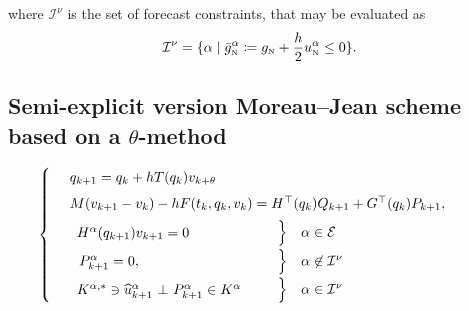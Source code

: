 where $\mathcal I^\nu$ is the set of forecast constraints, that may be evaluated as
\begin{equation}
  \label{eq:10}
  \mathcal I^\nu = \{\alpha \mid \bar g_{\hbox{\tiny{N}}}^\alpha \coloneqq g_{\hbox{\tiny{N}}} + \frac h 2 u^\alpha_{\hbox{\tiny{N}}} \leq 0\}.
\end{equation}


\subsection{Semi-explicit version Moreau--Jean scheme based on a  $\theta$-method}

\begin{equation}
    \label{eq:Moreau--Jean-explicit}
    \begin{cases}
      ~~\begin{array}{l}
        q_{k+1} = q_{k} + h T(q_{k}) v_{k+\theta} \quad \\[1ex]
        M(v_{k+1}-v_k) - h  F(t_{k}, q_{k},v_{k}) =  H^\top(q_{k}) Q_{k+1}+  G^\top(q_{k}) P_{k+1},\quad\,\\[1ex]
      \end{array}\\
      ~~\begin{array}{lcl}
        \begin{array}{l}
          H^\alpha(q_{k+1}) v_{k+1}  =  0\\
        \end{array} & \left. \begin{array}{l}
          \vphantom{H^\alpha(q_{k+1}) v_{k+1}  =  0}\\[1ex]
        \end{array}\right\}    &\alpha \in \mathcal E  \\[1ex]
      ~~P_{k+1}^\alpha= 0, &
      \left. \begin{array}{l}
          \vphantom{P_{k+1}^\alpha= 0,  \delta^\alpha_{k+1}=0}\\[1ex]
        \end{array}\right\}   & \alpha \not\in \mathcal I^\nu \\[1ex]
      \begin{array}{l}
          {K}^{\alpha,*} \ni \widehat u_{k+1}^\alpha~ \bot~ P_{k+1}^\alpha \in {K}^\alpha \\
      \end{array} &
      \left.\begin{array}{l}
          \vphantom{{K}^{\alpha,*} \ni \widehat u_{k+1}^\alpha~ \bot~ P_{k+1}^\alpha \in {K}^\alpha} \\
        \end{array}\right\}
      &\alpha \in \mathcal I^\nu\\
  \end{array}
\end{cases}
\end{equation}

